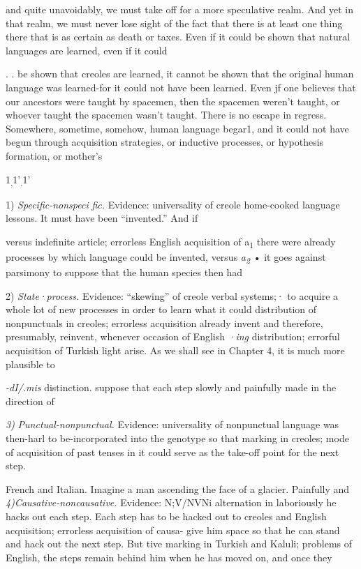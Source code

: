 
and quite unavoidably, we must take off for a more speculative realm. And yet in that realm, we must never lose sight of the fact that there is at least one thing there that is as certain as death or taxes. Even if it could be shown that natural languages are learned, even if it could

. . be shown that creoles are learned, it cannot be shown that the original human language was learned{}-for it could not have been learned. Even jf one believes that our ancestors were taught by spacemen, then the spacemen weren't taught, or whoever taught the spacemen wasn't taught. There is no escape in regress. Somewhere, sometime, somehow, human language begar1, and it could not have begun through acquisition strategies, or inductive processes, or hypothesis formation, or mother's

1\textsubscript{,}1'\textsubscript{.}1'

1) \textit{S}\textit{pec}\textit{i}\textit{fic-nonspeci} \textit{fic. }Evidence: universality of creole home-cooked language lessons. It must have been ``invented.'' And if

versus indefinite article; errorless English acquisition of a\textsubscript{1 }there were already processes by which language could be invented, versus \textit{a}\textit{\textsubscript{2}}\textsubscript{ }• it goes against parsimony to suppose that the human species then had

2) \textit{State}\textit{·}\textit{process.} Evidence: ``skewing'' of creole verbal systems;· to acquire a whole lot of new processes in order to learn what it could distribution of nonpunctuals in creoles; errorless acquisition already invent and therefore, presumably, reinvent, whenever occasion of English \textit{·}\textit{ing }distribution; errorful acquisition of Turkish l{\textquotedbl}ight arise. As we shall see in Chapter 4, it is much more plausible to

\textit{{}-dI/.mis} distinction. suppose that each step slowly and painfully made in the direction of

\textit{3}\textit{)} \textit{Punctual-nonpunctual. }Evidence: universality of nonpunctual language was then-harl to be-incorporated into the genotype so that marking in creoles; mode of acquisition of past tenses in it could serve as the take-off point for the next step.

French and Italian. Imagine a man ascending the face of a glacier. Painfully and \textit{4)Causative-noncausative. }Evidence: N;V/NVNi alternation in laboriously he hacks out each step. Each step has to be hacked out to creoles and English acquisition; errorless acquisition of causa- give him space so that he can stand and hack out the next step. But tive marking in Turkish and Kaluli; problems of English, the steps remain behind him when he has moved on, and once they


